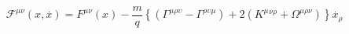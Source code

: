 \begin{equation}
\mathcal{F}^{\mu \nu }(x,\stackrel{.}{x})=F^{\mu \nu }(x)-\frac{m}{q}\left\{
\left( \Gamma ^{\mu \rho \upsilon }-\Gamma ^{\rho \upsilon \mu }\right) +2%
(K^{\mu }{}^{\nu \rho }+\Omega ^{\mu \rho \nu })\right\} \stackrel{.%
}{x}_{\rho }
\end{equation}

